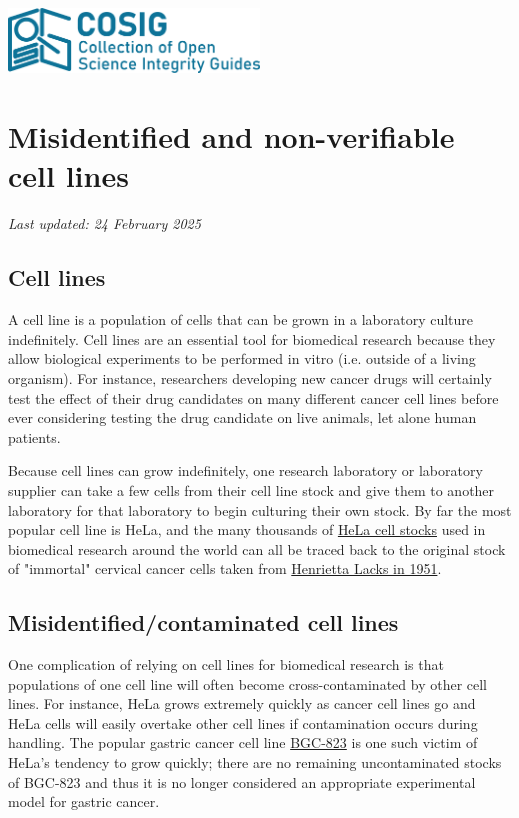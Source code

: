 \documentclass[letterpaper, 12pt]{article}
\begin{document}
\flushleft
\includegraphics[width=0.5\textwidth]{img/home/241017_final_logo_mockup.png}

\section*{Misidentified and non-verifiable cell lines}
\textit{Last updated: 24 February 2025}
\subsection*{Cell lines}

A cell line is a population of cells that can be grown in a laboratory culture indefinitely. Cell lines are an essential tool for biomedical research because they allow biological experiments to be performed in vitro (i.e. outside of a living organism). For instance, researchers developing new cancer drugs will certainly test the effect of their drug candidates on many different cancer cell lines before ever considering testing the drug candidate on live animals, let alone human patients.

Because cell lines can grow indefinitely, one research laboratory or laboratory supplier can take a few cells from their cell line stock and give them to another laboratory for that laboratory to begin culturing their own stock. By far the most popular cell line is HeLa, and the many thousands of \href{https://www.cellosaurus.org/CVCL_0030}{HeLa cell stocks} used in biomedical research around the world can all be traced back to the original stock of "immortal" cervical cancer cells taken from \href{https://en.wikipedia.org/wiki/Henrietta_Lacks}{Henrietta Lacks in 1951}.

\subsection*{Misidentified/contaminated cell lines}

One complication of relying on cell lines for biomedical research is that populations of one cell line will often become cross-contaminated by other cell lines. For instance, HeLa grows extremely quickly as cancer cell lines go and HeLa cells will easily overtake other cell lines if contamination occurs during handling. The popular gastric cancer cell line \href{https://www.cellosaurus.org/CVCL_3360}{BGC-823} is one such victim of HeLa’s tendency to grow quickly; there are no remaining uncontaminated stocks of BGC-823 and thus it is no longer considered an appropriate experimental model for gastric cancer.
\end{document}
